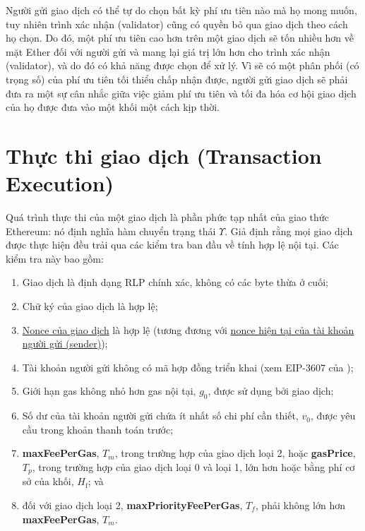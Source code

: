 \documentclass[9pt,oneside]{amsart}
\begin{document}
\begin{multicols}{2}
Người gửi giao dịch có thể tự do chọn bất kỳ phí ưu tiên nào mà họ mong muốn, tuy nhiên trình xác nhận (validator) cũng có quyền bỏ qua giao dịch theo cách họ chọn. Do đó, một phí ưu tiên cao hơn trên một giao dịch sẽ tốn nhiều hơn về mặt Ether đối với người gửi và mang lại giá trị lớn hơn cho trình xác nhận (validator), và do đó có khả năng được chọn để xử lý. Vì sẽ có một phân phối (có trọng số) của phí ưu tiên tối thiểu chấp nhận được, người gửi giao dịch sẽ phải đưa ra một sự cân nhắc giữa việc giảm phí ưu tiên và tối đa hóa cơ hội giao dịch của họ được đưa vào một khối một cách kịp thời.


\section{Thực thi giao dịch (Transaction Execution)} \label{ch:transactions}

Quá trình thực thi của một giao dịch là phần phức tạp nhất của giao thức Ethereum: nó định nghĩa hàm chuyển trạng thái \hyperlink{Upsilon_state_transition}{$\Upsilon$}. Giả định rằng mọi giao dịch được thực hiện đều trải qua các kiểm tra ban đầu về tính hợp lệ nội tại. Các kiểm tra này bao gồm:

\begin{enumerate}
\item Giao dịch là định dạng RLP chính xác, không có các byte thừa ở cuối;
\item Chữ ký của giao dịch là hợp lệ;
\item \hyperlink{transaction_nonce}{Nonce của giao dịch} là hợp lệ (tương đương với \hyperlink{account_nonce}{nonce hiện tại của tài khoản người gửi (sender)});
\item Tài khoản người gửi không có mã hợp đồng triển khai (xem EIP-3607 của \cite{EIP-3607});
\item Giới hạn gas không nhỏ hơn gas nội tại, $g_0$, được sử dụng bởi giao dịch;
\item Số dư của tài khoản người gửi chứa ít nhất số chi phí cần thiết, $v_0$, được yêu cầu trong khoản thanh toán trước;
\item \textbf{maxFeePerGas}, $T_m$, trong trường hợp của giao dịch loại 2, hoặc \textbf{gasPrice}, $T_p$, trong trường hợp của giao dịch loại 0 và loại 1, lớn hơn hoặc bằng phí cơ sở của khối, $H_{\mathrm{f}}$; và
\item đối với giao dịch loại 2, \textbf{maxPriorityFeePerGas}, $T_f$, phải không lớn hơn \textbf{maxFeePerGas}, $T_m$.
\end{enumerate}


\end{multicols}
\end{document}
